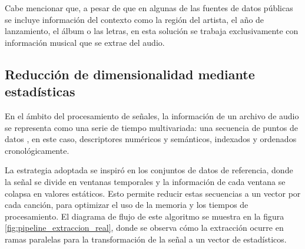 Cabe mencionar que, a pesar de que en algunas de las fuentes de datos públicas se incluye información del contexto como la región del artista, el año de lanzamiento, el álbum o las letras, en esta solución se trabaja exclusivamente con información musical que se extrae del audio.

\subsection{Reducción de dimensionalidad mediante estadísticas}
\label{sec:algoritmo}

En el ámbito del procesamiento de señales, la información de un archivo de audio se representa como una serie de tiempo multivariada: una secuencia de puntos de datos \cite{muller2015fundamentals}, en este caso, descriptores numéricos y semánticos, indexados y ordenados cronológicamente.

La estrategia adoptada se inspiró en los conjuntos de datos de referencia, donde la señal se divide en ventanas temporales y la información de cada ventana se colapsa en valores estáticos. Esto permite reducir estas secuencias a un vector por cada canción, para optimizar el uso de la memoria y los tiempos de procesamiento.
El diagrama de flujo de este algoritmo se muestra en la figura \ref{fig:pipeline_extraccion_real}, donde se observa cómo la extracción ocurre en ramas paralelas para la transformación de la señal a un vector de estadísticos.

